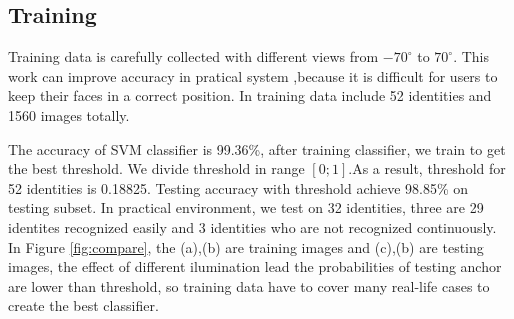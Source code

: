 \documentclass[journal, twocolumn]{IEEEtran}
\begin{document}
\subsection{Training}
Training data is carefully collected with different views from $-70^\circ$ to $70^\circ$. This work can improve accuracy in pratical system ,because it is difficult for users to keep their faces in a correct position. In training data include 52 identities and 1560 images totally.

The accuracy of SVM classifier is 99.36\%, after training classifier, we train to get the best threshold. We divide threshold in range $[0;1]$.As a result, threshold for 52 identities is 0.18825. Testing accuracy with threshold achieve 98.85\% on testing subset. In practical environment, we test on 32 identities, three are 29 identites recognized easily and 3 identities who are not recognized continuously. In Figure \ref{fig:compare}, the (a),(b) are training images and (c),(b) are testing images, the effect of different ilumination lead the probabilities of testing anchor are lower than threshold, so training data have to cover many real-life cases to create the best classifier.  
\end{document}

